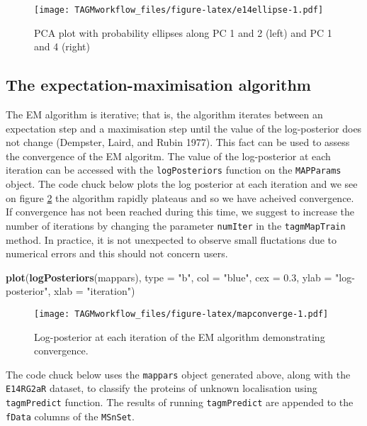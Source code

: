 \documentclass[]{article}
\newenvironment{Shaded}{\begin{snugshade}}{\end{snugshade}}
\newcommand{\KeywordTok}[1]{\textcolor[rgb]{0.13,0.29,0.53}{\textbf{{#1}}}}
\newcommand{\DataTypeTok}[1]{\textcolor[rgb]{0.13,0.29,0.53}{{#1}}}
\newcommand{\FloatTok}[1]{\textcolor[rgb]{0.00,0.00,0.81}{{#1}}}
\newcommand{\StringTok}[1]{\textcolor[rgb]{0.31,0.60,0.02}{{#1}}}
\newcommand{\NormalTok}[1]{{#1}}
\begin{document}
\begin{figure}[htbp]
\centering
\texttt{[image: TAGMworkflow\_files/figure-latex/e14ellipse-1.pdf]}
\caption{\label{fig:e14ellipse}PCA plot with probability ellipses along PC 1
and 2 (left) and PC 1 and 4 (right)}
\end{figure}

\subsection{The expectation-maximisation
algorithm}\label{the-expectation-maximisation-algorithm}

The EM algorithm is iterative; that is, the algorithm iterates between
an expectation step and a maximisation step until the value of the
log-posterior does not change (Dempster, Laird, and Rubin 1977). This
fact can be used to assess the convergence of the EM algoritm. The value
of the log-posterior at each iteration can be accessed with the
\texttt{logPosteriors} function on the \texttt{MAPParams} object. The
code chuck below plots the log posterior at each iteration and we see on
figure \ref{fig:mapconverge} the algorithm rapidly plateaus and so we
have acheived convergence. If convergence has not been reached during
this time, we suggest to increase the number of iterations by changing
the parameter \texttt{numIter} in the \texttt{tagmMapTrain} method. In
practice, it is not unexpected to observe small fluctations due to
numerical errors and this should not concern users.

\begin{Shaded}
\begin{Highlighting}[]
\KeywordTok{plot}\NormalTok{(}\KeywordTok{logPosteriors}\NormalTok{(mappars), }\DataTypeTok{type =} \StringTok{"b"}\NormalTok{, }\DataTypeTok{col =} \StringTok{"blue"}\NormalTok{,}
     \DataTypeTok{cex =} \FloatTok{0.3}\NormalTok{, }\DataTypeTok{ylab =} \StringTok{"log-posterior"}\NormalTok{, }\DataTypeTok{xlab =} \StringTok{"iteration"}\NormalTok{)}
\end{Highlighting}
\end{Shaded}

\begin{figure}[htbp]
\centering
\texttt{[image: TAGMworkflow\_files/figure-latex/mapconverge-1.pdf]}
\caption{\label{fig:mapconverge}Log-posterior at each iteration of the EM
algorithm demonstrating convergence.}
\end{figure}

The code chuck below uses the \texttt{mappars} object generated above,
along with the \texttt{E14RG2aR} dataset, to classify the proteins of
unknown localisation using \texttt{tagmPredict} function. The results of
running \texttt{tagmPredict} are appended to the \texttt{fData} columns
of the \texttt{MSnSet}.
\end{document}

